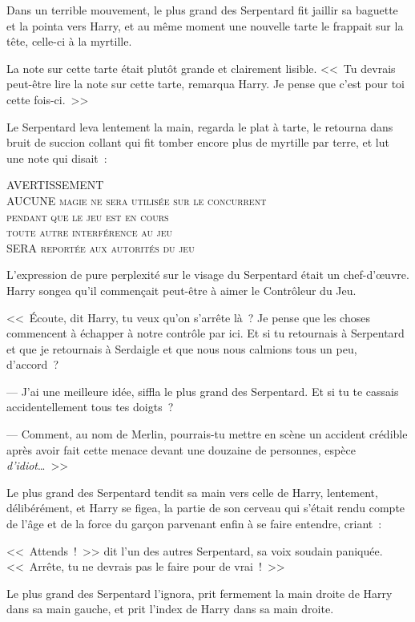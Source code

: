 Dans un terrible mouvement, le plus grand des Serpentard fit jaillir sa baguette et la pointa vers Harry, et au même moment une nouvelle tarte le frappait sur la tête, celle-ci à la myrtille.

La note sur cette tarte était plutôt grande et clairement lisible. <<~Tu devrais peut-être lire la note sur cette tarte, remarqua Harry. Je pense que c'est pour toi cette fois-ci.~>>

Le Serpentard leva lentement la main, regarda le plat à tarte, le retourna dans bruit de succion collant qui fit tomber encore plus de myrtille par terre, et lut une note qui disait~: \begin{center} \scshape \MakeUppercase{Avertissement}\\ \MakeUppercase{Aucune} magie ne sera utilisée sur le concurrent\\ pendant que le jeu est en cours\\ toute autre interférence au jeu\\ \MakeUppercase{sera} reportée aux autorités du jeu\end{center}

L'expression de pure perplexité sur le visage du Serpentard était un chef-d'œuvre. Harry songea qu'il commençait peut-être à aimer le Contrôleur du Jeu.

<<~Écoute, dit Harry, tu veux qu'on s'arrête là~? Je pense que les choses commencent à échapper à notre contrôle par ici. Et si tu retournais à Serpentard et que je retournais à Serdaigle et que nous nous calmions tous un peu, d'accord~?

--- J'ai une meilleure idée, siffla le plus grand des Serpentard. Et si tu te cassais accidentellement tous tes doigts~?

--- Comment, au nom de Merlin, pourrais-tu mettre en scène un accident crédible après avoir fait cette menace devant une douzaine de personnes, espèce \emph{d'idiot}…~>>

Le plus grand des Serpentard tendit sa main vers celle de Harry, lentement, délibérément, et Harry se figea, la partie de son cerveau qui s'était rendu compte de l'âge et de la force du garçon parvenant enfin à se faire entendre, criant~: 

<<~Attends~!~>> dit l'un des autres Serpentard, sa voix soudain paniquée. <<~Arrête, tu ne devrais pas le faire pour de vrai~!~>>

Le plus grand des Serpentard l'ignora, prit fermement la main droite de Harry dans sa main gauche, et prit l'index de Harry dans sa main droite.


